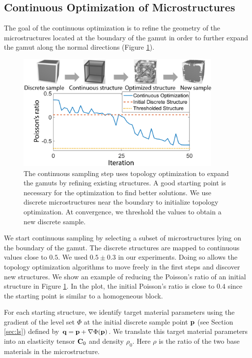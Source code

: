 \subsection{Continuous Optimization of Microstructures}
The goal of the continuous optimization is to refine the geometry of the microstructures located at the boundary of the gamut in order to further expand the gamut along the normal directions (Figure \ref{fig:contMicro}).
\begin{figure}[h]
	\centering
	\includegraphics[width=0.9\textwidth]{images/contOpt.png}
	\vspace{-0.2cm}
	\caption{The continuous sampling step uses topology optimization to expand the gamuts by refining existing structures. A good starting point is necessary for the optimization to find better solutions. 
		We use discrete microstructures near the boundary to initialize topology optimization. 
		At convergence, we threshold the values to obtain a new discrete sample.}
	\label{fig:contMicro}
\end{figure}
We start continuous sampling by selecting a subset of microstructures lying on the boundary of the gamut.
The discrete structures are mapped to continuous values close to $0.5$.
We used $0.5\pm0.3$ in our experiments.
Doing so allows the topology optimization algorithms to move freely in the first steps and discover new structures.
We show an example of reducing the Poisson's ratio of an initial structure in Figure \ref{fig:contMicro}.
In the plot, the initial Poisson's ratio is close to $0.4$ since the starting point is similar to a homogeneous block.

For each starting structure, we identify target material parameters using the gradient of the level set $\Phi$ at the initial discrete sample point $\bf p$ (see Section \ref{sec:ls}) defined by ${\bf q} = {\bf p} + \nabla \Phi ({\bf p})$.
We translate this target material parameters into an elasticity tensor $\mathbf{C}_0$ and density $\rho_0$. Here $\rho$ is the ratio of the two base materials in the microstructure.

